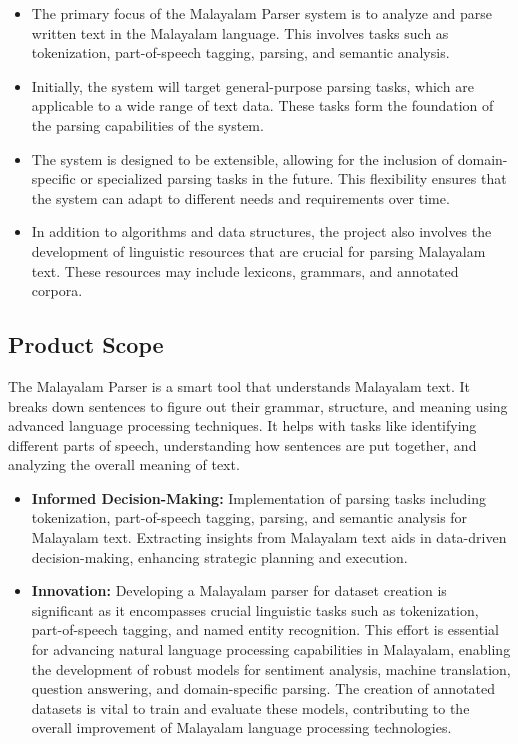 \documentclass[12pt]{article}
\begin{document}
	\begin{itemize}[label=-]
		\item The primary focus of the Malayalam Parser system is to analyze and parse written text in the Malayalam language. This involves tasks such as tokenization, part-of-speech tagging, parsing, and semantic analysis.
		\item Initially, the system will target general-purpose parsing tasks, which are applicable to a wide range of text data. These tasks form the foundation of the parsing capabilities of the system.
		\item The system is designed to be extensible, allowing for the inclusion of domain-specific or specialized parsing tasks in the future. This flexibility ensures that the system can adapt to different needs and requirements over time.
		\item In addition to algorithms and data structures, the project also involves the development of linguistic resources that are crucial for parsing Malayalam text. These resources may include lexicons, grammars, and annotated corpora.
	\end{itemize}
	
	\subsection{Product Scope}
	The Malayalam Parser is a smart tool that understands Malayalam text. It breaks
	down sentences to figure out their grammar, structure, and meaning using advanced
	language processing techniques. It helps with tasks like identifying different parts of
	speech, understanding how sentences are put together, and analyzing the overall meaning
	of text.\\
	
	\begin{itemize}[label=-]
		\item \textbf{Informed Decision-Making:} Implementation of parsing tasks including tokenization, part-of-speech tagging, parsing, and semantic analysis for Malayalam text. Extracting insights from Malayalam text aids in	data-driven decision-making, enhancing strategic planning and execution.
		
		\item \textbf{Innovation:} Developing a Malayalam parser for dataset creation is significant as it encompasses crucial linguistic tasks such as tokenization, part-of-speech tagging, and named entity recognition. This effort is essential for advancing natural language processing capabilities in Malayalam, enabling the development of robust models for sentiment analysis, machine translation, question answering, and domain-specific parsing. The creation of annotated datasets is vital to train and evaluate these models, contributing to the overall improvement of Malayalam language processing technologies.
	\end{itemize}
\end{document}
